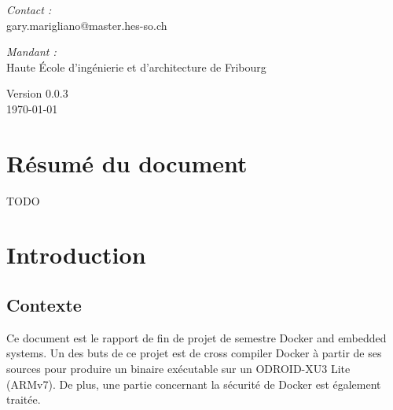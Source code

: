 \documentclass[11pt,a4paper,oneside]{report}
\newcommand{\school}{Haute École d'ingénierie et d'architecture de Fribourg}
\newcommand{\version}{0.0.3}
\newcommand{\odroid}{ODROID-XU3 Lite }
\begin{document}
\begin{titlepage}
\begin{center}
\vfill

\noindent
\begin{minipage}{0.4\textwidth}
  \begin{flushleft} \large
    \emph{Contact :}\\
    gary.marigliano@master.hes-so.ch
  \end{flushleft}
\end{minipage}%
\begin{minipage}{0.4\textwidth}
  \begin{flushright} \large
    \emph{Mandant :} \\
    \school
  \end{flushright}
\end{minipage}

\vfill

{\large Version \version \\ \today}


\end{center}
\end{titlepage}

\pagestyle{historystyle}
\begin{versionhistory}  
\end{versionhistory}


\chapter{Résumé du document}

TODO

\tableofcontents
{}

\pagestyle{normal}

\chapter{Introduction}

\section{Contexte}\label{contexte}

Ce document est le rapport de fin de projet de semestre Docker and embedded systems. Un des buts de ce projet est de cross compiler Docker à partir de ses sources pour produire un binaire exécutable sur un \odroid (ARMv7). De plus, une partie concernant la sécurité de Docker est également traitée.
\end{document}
